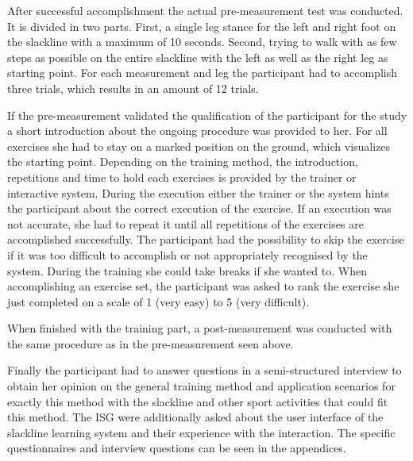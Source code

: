After successful accomplishment the actual pre-measurement test was conducted.
It is divided in two parts.
First, a single leg stance for the left and right foot on the slackline with a maximum of 10 seconds.
Second, trying to walk with as few steps as possible on the entire slackline with the left as well as the right leg as starting point.
For each measurement and leg the participant had to accomplish three trials, which results in an amount of 12 trials.

If the pre-measurement validated the qualification of the participant for the study a short introduction about the ongoing procedure was provided to her.
For all exercises she had to stay on a marked position on the ground, which visualizes the starting point.
Depending on the training method, the introduction, repetitions and time to hold each exercises is provided by the trainer or interactive system.
During the execution either the trainer or the system hints the participant about the correct execution of the exercise.
If an execution was not accurate, she had to repeat it until all repetitions of the exercises are accomplished successfully.
The participant had the possibility to skip the exercise if it was too difficult to accomplish or not appropriately recognised by the system.
During the training she could take breaks if she wanted to.
When accomplishing an exercise set, the participant was asked to rank the exercise she just completed on a scale of 1 (very easy) to 5 (very difficult).

When finished with the training part, a post-measurement was conducted with the same procedure as in the pre-measurement seen above.

Finally the participant had to answer questions in a semi-structured interview to obtain her opinion on the general training method and application scenarios for exactly this method with the slackline and other sport activities that could fit this method.
The ISG were additionally asked about the user interface of the slackline learning system and their experience with the interaction.
The specific questionnaires and interview questions can be seen in the appendices.

